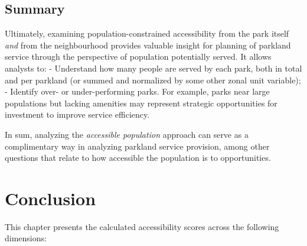 \documentclass[
11pt, %
oneside, %
english, %
singlespacing, %
]{macthesis} %
\begin{document}
\subsection{Summary}\label{summary-1}

Ultimately, examining population-constrained accessibility from the park itself \emph{and} from the neighbourhood provides valuable insight for planning of parkland service through the perspective of population potentially served. It allows analysts to:
- Understand how many people are served by each park, both in total and per parkland (or summed and normalized by some other zonal unit variable);
- Identify over- or under-performing parks. For example, parks near large populations but lacking amenities may represent strategic opportunities for investment to improve service efficiency.

In sum, analyzing the \emph{accessible population} approach can serve as a complimentary way in analyzing parkland service provision, among other questions that relate to how accessible the population is to opportunities.

\section{Conclusion}\label{conclusion}

This chapter presents the calculated accessibility scores across the following dimensions:
\end{document}
